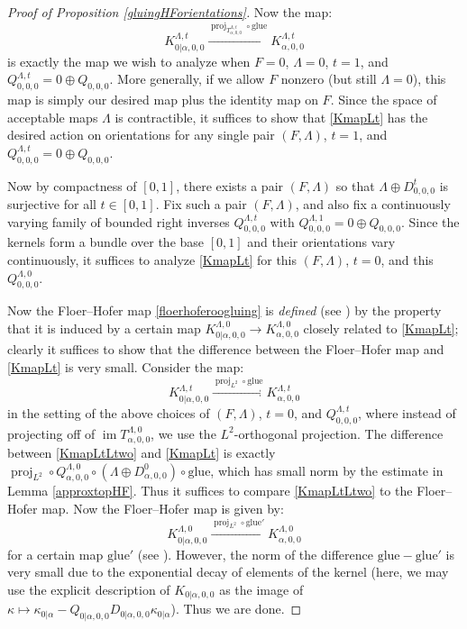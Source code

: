 \documentclass[12pt]{article}
\theoremstyle{definition}
\theoremstyle{remark}
\numberwithin{equation}{subsection}
\newcommand{\proj}{\operatorname{proj}}
\newcommand{\im}{\operatorname{im}}
\begin{document}
\begin{proof}[Proof of Proposition \ref{gluingHForientations}]
Now the map:
\begin{equation}\label{KmapLt}
K_{0|\alpha,0,0}^{\Lambda,t}\xrightarrow{{\proj_{T_{\alpha,0,0}^{\Lambda,t}}}\circ{\mathrm{glue}}}K_{\alpha,0,0}^{\Lambda,t}
\end{equation}
is exactly the map we wish to analyze when $F=0$, $\Lambda=0$, $t=1$, and $Q_{0,0,0}^{\Lambda,t}=0\oplus Q_{0,0,0}$.  More generally, if we allow $F$ nonzero (but still $\Lambda=0$), this map is simply our desired map plus the identity map on $F$.  Since the space of acceptable maps $\Lambda$ is contractible, it suffices to show that \eqref{KmapLt} has the desired action on orientations for any single pair $(F,\Lambda)$, $t=1$, and $Q_{0,0,0}^{\Lambda,t}=0\oplus Q_{0,0,0}$.

Now by compactness of $[0,1]$, there exists a pair $(F,\Lambda)$ so that $\Lambda\oplus D_{0,0,0}^t$ is surjective for all $t\in[0,1]$.  Fix such a pair $(F,\Lambda)$, and also fix a continuously varying family of bounded right inverses $Q_{0,0,0}^{\Lambda,t}$ with $Q_{0,0,0}^{\Lambda,1}=0\oplus Q_{0,0,0}$.  Since the kernels form a bundle over the base $[0,1]$ and their orientations vary continuously, it suffices to analyze \eqref{KmapLt} for this $(F,\Lambda)$, $t=0$, and this $Q_{0,0,0}^{\Lambda,0}$.

Now the Floer--Hofer map \eqref{floerhoferoogluing} is \emph{defined} (see \cite[Proposition 9]{floerhoferorientations}) by the property that it is induced by a certain map $K_{0|\alpha,0,0}^{\Lambda,0}\to K_{\alpha,0,0}^{\Lambda,0}$ closely related to \eqref{KmapLt}; clearly it suffices to show that the difference between the Floer--Hofer map and \eqref{KmapLt} is very small.  Consider the map:
\begin{equation}\label{KmapLtLtwo}
K_{0|\alpha,0,0}^{\Lambda,t}\xrightarrow{{\proj_{L^2}}\circ{\mathrm{glue}}}K_{\alpha,0,0}^{\Lambda,t}
\end{equation}
in the setting of the above choices of $(F,\Lambda)$, $t=0$, and $Q_{0,0,0}^{\Lambda,t}$, where instead of projecting off of $\im T_{\alpha,0,0}^{\Lambda,0}$, we use the $L^2$-orthogonal projection.  The difference between \eqref{KmapLtLtwo} and \eqref{KmapLt} is exactly ${\proj_{L^2}}\circ Q^{\Lambda,0}_{\alpha,0,0}\circ(\Lambda\oplus D^0_{\alpha,0,0})\circ{\mathrm{glue}}$, which has small norm by the estimate in Lemma \ref{approxtopHF}.  Thus it suffices to compare \eqref{KmapLtLtwo} to the Floer--Hofer map.  Now the Floer--Hofer map is given by:
\begin{equation}\label{KmapLtFH}
K_{0|\alpha,0,0}^{\Lambda,0}\xrightarrow{{\proj_{L^2}}\circ{\mathrm{glue}'}}K_{\alpha,0,0}^{\Lambda,0}
\end{equation}
for a certain map $\mathrm{glue}'$ (see \cite[Proposition 9]{floerhoferorientations}).  However, the norm of the difference $\mathrm{glue}-\mathrm{glue}'$ is very small due to the exponential decay of elements of the kernel (here, we may use the explicit description of $K_{0|\alpha,0,0}$ as the image of $\kappa\mapsto\kappa_{0|\alpha}-Q_{0|\alpha,0,0}D_{0|\alpha,0,0}\kappa_{0|\alpha}$).  Thus we are done.
\end{proof}



\end{document}
